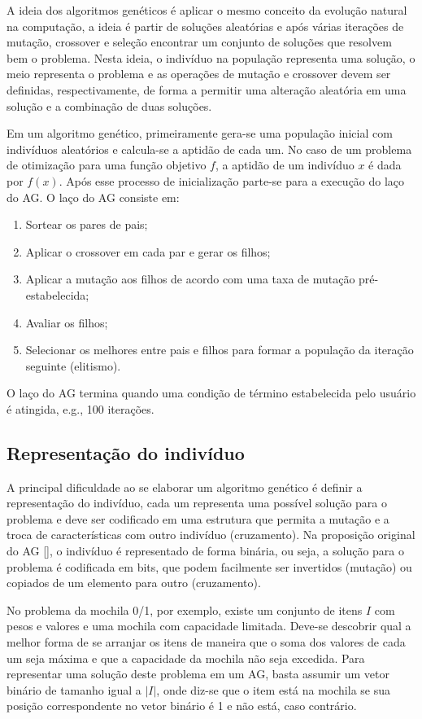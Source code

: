 A ideia dos algoritmos genéticos é aplicar o mesmo conceito da evolução natural na computação, a ideia é partir de soluções aleatórias e após várias iterações de mutação, crossover e seleção encontrar um conjunto de soluções que resolvem bem o problema. Nesta ideia, o indivíduo na população representa uma solução, o meio representa o problema e as operações de mutação e crossover devem ser definidas, respectivamente, de forma a permitir uma alteração aleatória em uma solução e a combinação de duas soluções.

Em um algoritmo genético, primeiramente gera-se uma população inicial com indivíduos aleatórios e calcula-se a aptidão de cada um. No caso de um problema de otimização para uma função objetivo $f$, a aptidão de um indivíduo $x$ é dada por $f(x)$. Após esse processo de inicialização parte-se para a execução do laço do AG. O laço do AG consiste em:

\begin{enumerate}  
	\item Sortear os pares de pais; 
	\item Aplicar o crossover em cada par e gerar os filhos; 
	\item Aplicar a mutação aos filhos de acordo com uma taxa de mutação pré-estabelecida;
	\item Avaliar os filhos;
	\item Selecionar os melhores entre pais e filhos para formar a população da iteração seguinte (elitismo).
\end{enumerate}

O laço do AG termina quando uma condição de término estabelecida pelo usuário é atingida, e.g., 100 iterações.

\subsection{Representação do indivíduo}
A principal dificuldade ao se elaborar um algoritmo genético é definir a representação do indivíduo, cada um representa uma possível solução para o problema e deve ser codificado em uma estrutura que permita a mutação e a troca de características com outro indivíduo (cruzamento). Na proposição original do AG [], o indivíduo é representado de forma binária, ou seja, a solução para o problema é codificada em bits, que podem facilmente ser invertidos (mutação) ou copiados de um elemento para outro (cruzamento).

No problema da mochila 0/1, por exemplo, existe um conjunto de itens $I$ com pesos e valores e uma mochila com capacidade limitada. Deve-se descobrir qual a melhor forma de se arranjar os itens de maneira que o soma dos valores de cada um seja máxima e que a capacidade da mochila não seja excedida. Para representar uma solução deste problema em um AG, basta assumir um vetor binário de tamanho igual a $|I|$, onde diz-se que o item está na mochila se sua posição correspondente no vetor binário é 1 e não está, caso contrário.


